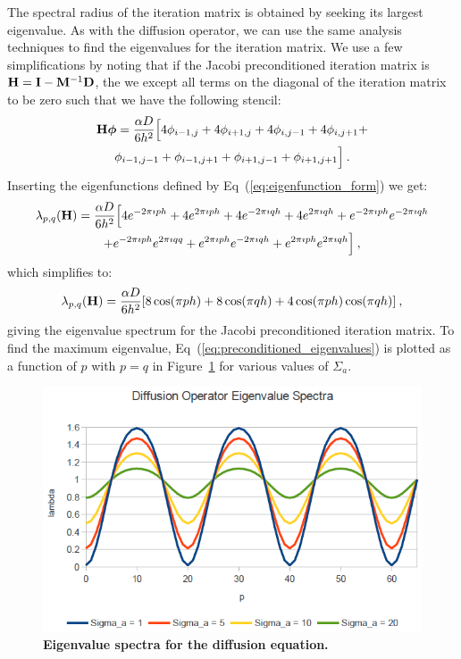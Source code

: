 The spectral radius of the iteration matrix is obtained by seeking its
largest eigenvalue. As with the diffusion operator, we can use the
same analysis techniques to find the eigenvalues for the iteration
matrix. We use a few simplifications by noting that if the Jacobi
preconditioned iteration matrix is $\mathbf{H} = \mathbf{I} -
\mathbf{M}^{-1}\mathbf{D}$, the we except all terms on the diagonal of the
iteration matrix to be zero such that we have the following stencil:
\begin{multline}
  \mathbf{H}\boldsymbol{\phi} = \frac{\alpha D}{6h^2}\Big[4 \phi_{i-1,j} +
    4 \phi_{i+1,j} + 4 \phi_{i,j-1} + 4 \phi_{i,j+1}
    +\\ \phi_{i-1,j-1} + \phi_{i-1,j+1} + \phi_{i+1,j-1} +
    \phi_{i+1,j+1}\Big]\:.
  \label{eq:iteration_stencil}
\end{multline}
Inserting the eigenfunctions defined by
Eq~(\ref{eq:eigenfunction_form}) we get:
\begin{multline}
  \lambda_{p,q}(\mathbf{H}) = \frac{\alpha D}{6h^2}\Big[4 e^{-2 \pi \imath p
      h} + 4 e^{2 \pi \imath p h} + 4 e^{-2 \pi \imath q h} + 4 e^{2
      \pi \imath q h} + e^{-2 \pi \imath p h} e^{-2 \pi \imath q h}
    \\ + e^{-2 \pi \imath p h} e^{2 \pi \imath q q} + e^{2 \pi \imath
      p h} e^{-2 \pi \imath q h} + e^{2 \pi \imath p h} e^{2 \pi
      \imath q h}\Big]\:,
  \label{eq:iteration_deriv}
\end{multline}
which simplifies to:
\begin{equation}
  \lambda_{p,q}(\mathbf{H}) = \frac{\alpha D}{6h^2}[ 8 \cos(\pi p h) + 8
    \cos(\pi q h) + 4 \cos(\pi p h) \cos(\pi q h)]\:,
  \label{eq:iteration_spectrum}
\end{equation}
giving the eigenvalue spectrum for the Jacobi preconditioned iteration
matrix. To find the maximum eigenvalue,
Eq~(\ref{eq:preconditioned_eigenvalues}) is plotted as a function of
$p$ with $p=q$ in Figure~\ref{fig:diffusion_spectrum} for various
values of $\Sigma_a$.
\begin{figure}[t!]
  \begin{center}
    \includegraphics[width=5in,clip]{chapters/parallel_mc/diffusion_spectrum.png}
  \end{center}
  \caption{\textbf{Eigenvalue spectra for the diffusion equation.}}
  \label{fig:diffusion_spectrum}
\end{figure}
